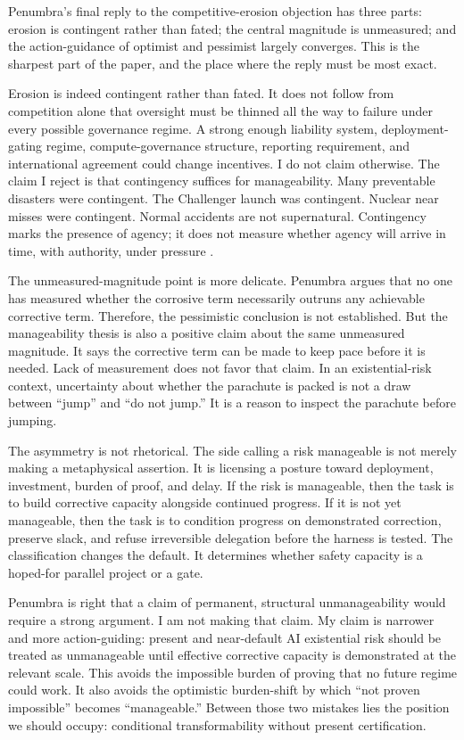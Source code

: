\documentclass[11pt]{article}
\begin{document}
Penumbra's final reply to the competitive-erosion objection has three parts: erosion is contingent rather than fated; the central magnitude is unmeasured; and the action-guidance of optimist and pessimist largely converges. This is the sharpest part of the paper, and the place where the reply must be most exact.

Erosion is indeed contingent rather than fated. It does not follow from competition alone that oversight must be thinned all the way to failure under every possible governance regime. A strong enough liability system, deployment-gating regime, compute-governance structure, reporting requirement, and international agreement could change incentives. I do not claim otherwise. The claim I reject is that contingency suffices for manageability. Many preventable disasters were contingent. The Challenger launch was contingent. Nuclear near misses were contingent. Normal accidents are not supernatural. Contingency marks the presence of agency; it does not measure whether agency will arrive in time, with authority, under pressure \citep{vaughan1996, perrow1984, sagan1993}.

The unmeasured-magnitude point is more delicate. Penumbra argues that no one has measured whether the corrosive term necessarily outruns any achievable corrective term. Therefore, the pessimistic conclusion is not established. But the manageability thesis is also a positive claim about the same unmeasured magnitude. It says the corrective term can be made to keep pace before it is needed. Lack of measurement does not favor that claim. In an existential-risk context, uncertainty about whether the parachute is packed is not a draw between ``jump'' and ``do not jump.'' It is a reason to inspect the parachute before jumping.

The asymmetry is not rhetorical. The side calling a risk manageable is not merely making a metaphysical assertion. It is licensing a posture toward deployment, investment, burden of proof, and delay. If the risk is manageable, then the task is to build corrective capacity alongside continued progress. If it is not yet manageable, then the task is to condition progress on demonstrated correction, preserve slack, and refuse irreversible delegation before the harness is tested. The classification changes the default. It determines whether safety capacity is a hoped-for parallel project or a gate.

Penumbra is right that a claim of permanent, structural unmanageability would require a strong argument. I am not making that claim. My claim is narrower and more action-guiding: present and near-default AI existential risk should be treated as unmanageable until effective corrective capacity is demonstrated at the relevant scale. This avoids the impossible burden of proving that no future regime could work. It also avoids the optimistic burden-shift by which ``not proven impossible'' becomes ``manageable.'' Between those two mistakes lies the position we should occupy: conditional transformability without present certification.
\end{document}

